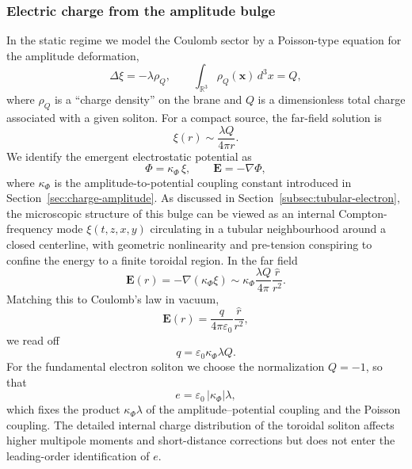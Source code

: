 \subsubsection{Electric charge from the amplitude bulge}

In the static regime we model the Coulomb sector by a Poisson-type equation for the amplitude deformation,
%
\begin{equation}
  \Delta \xi = -\lambda \rho_Q,
  \qquad
  \int_{\mathbb{R}^3} \rho_Q(\mathbf{x})\,d^3x = Q,
  \label{eq:poisson-xi-param}
\end{equation}
%
where $\rho_Q$ is a ``charge density'' on the brane and $Q$ is a dimensionless total charge associated with a given soliton.
For a compact source, the far-field solution is
%
\begin{equation}
  \xi(r) \sim \frac{\lambda Q}{4\pi r}.
\end{equation}
%
We identify the emergent electrostatic potential as
%
\begin{equation}
  \Phi = \kappa_{\Phi} \,\xi,
  \qquad
  \mathbf{E} = -\nabla \Phi,
\end{equation}
%
where $\kappa_{\Phi}$ is the amplitude-to-potential coupling constant introduced in Section~\ref{sec:charge-amplitude}.
As discussed in Section~\ref{subsec:tubular-electron}, the microscopic
structure of this bulge can be viewed as an internal Compton-frequency
mode $\xi(t,z,x,y)$ circulating in a tubular neighbourhood around a
closed centerline, with geometric nonlinearity and pre-tension
conspiring to confine the energy to a finite toroidal region.
In the far field
%
\begin{equation}
  \mathbf{E}(r)
  = -\nabla(\kappa_{\Phi} \xi)
  \sim \kappa_{\Phi} \frac{\lambda Q}{4\pi} \frac{\hat{r}}{r^2}.
  \label{eq:E-from-brane-param}
\end{equation}
%
Matching this to Coulomb's law in vacuum,
%
\begin{equation}
  \mathbf{E}(r) = \frac{q}{4\pi \varepsilon_0} \frac{\hat{r}}{r^2},
\end{equation}
%
we read off
%
\begin{equation}
  q = \varepsilon_0 \kappa_{\Phi} \lambda Q.
  \label{eq:q-matching}
\end{equation}
%
For the fundamental electron soliton we choose the normalization $Q=-1$, so that
%
\begin{equation}
  e = \varepsilon_0\,|\kappa_{\Phi}| \lambda,
  \label{eq:e-from-kappa-lambda}
\end{equation}
%
which fixes the product $\kappa_{\Phi} \lambda$ of the amplitude--potential coupling and the Poisson coupling.
The detailed internal charge distribution of the toroidal soliton affects higher multipole moments and short-distance corrections but does not enter the leading-order identification of $e$.

